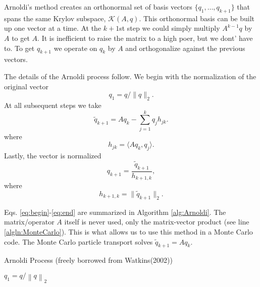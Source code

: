 \documentclass[11pt]{article}
\begin{document}
Arnoldi's method creates an orthonormal set of basis vectors $\{q_1, \ldots, q_{k+1}\}$ that spans the same Krylov subspace, $\mathcal{K}(A, q)$.  This orthonormal basis can be built up one vector at a time.  At the $k+1$st step we could simply multiply $A^{k-1}q$ by $A$ to get $A$.  It is inefficient to raise the matrix to a high poer, but we dont' have to.  To get $q_{k+1}$ we operate on $q_k$ by $A$ and orthogonalize against the previous vectors.  

The details of the Arnoldi process follow.  We begin with the normalization of the original vector
\begin{equation}
    q_1 = q/\|q\|_2.    \label{eq:begin}
\end{equation}
At all subsequent steps we take
\begin{equation}
    \tilde{q}_{k+1} = Aq_k - \sum_{j=1}^k q_j h_{jk}.   \label{eq:mvOrtho}
\end{equation}
where
\begin{equation}
    h_{jk} = \langle Aq_k, q_j \rangle.
\end{equation}
Lastly, the vector is normalized
\begin{equation}
    q_{k+1} = \frac{\tilde{q}_{k+1}}{h_{k+1,k}},
\end{equation}
where
\begin{equation}
    h_{k+1,k} = \|\tilde{q}_{k+1}\|_2. \label{eq:end}
\end{equation}

Eqs. \ref{eq:begin}-\ref{eq:end} are summarized in Algorithm \ref{alg:Arnoldi}.  The matrix/operator $A$ itself is never used, only the matrix-vector product (see line \ref{algln:MonteCarlo}).  This is what allows us to use this method in a Monte Carlo code.  The Monte Carlo particle transport solves $\tilde{q}_{k+1} = Aq_k$.

\begin{algorithm2e}
    \label{alg:Arnoldi}
    \SetVline
    \caption{Arnoldi Process (freely borrowed from Watkins(2002))}
    $q_1 = q/\left\|q\right\|_2$ \;
\end{algorithm2e}
\end{document}
